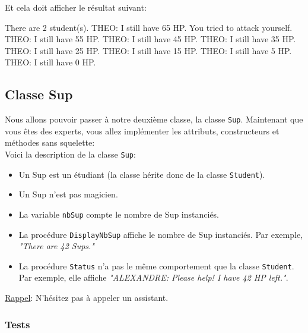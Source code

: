 \newpage
Et cela doit afficher le résultat suivant:

\begin{shell}
There are 2 student(s).
THEO: I still have 65 HP.
You tried to attack yourself.
THEO: I still have 55 HP.
THEO: I still have 45 HP.
THEO: I still have 35 HP.
THEO: I still have 25 HP.
THEO: I still have 15 HP.
THEO: I still have 5 HP.
THEO: I still have 0 HP.
\end{shell}

\subsection{Classe Sup}

Nous allons pouvoir passer à notre deuxième classe, la classe \texttt{Sup}. Maintenant que vous êtes des experts, vous allez implémenter
les attributs, constructeurs et méthodes sans squelette:\\ 

Voici la description de la classe \texttt{Sup}: 

\begin{itemize}
\item Un Sup est un étudiant (la classe hérite donc de la classe \texttt{Student}).
\item Un Sup n'est pas magicien.
\item La variable \texttt{nbSup} compte le nombre de Sup instanciés.
\item La procédure \texttt{DisplayNbSup} affiche le nombre de Sup instanciés. Par exemple, \textit{"There are 42 Sups."}
\item La procédure \texttt{Status} n'a pas le même comportement que la classe \texttt{Student}. Par exemple, elle affiche \textit{"ALEXANDRE: Please help! I have 42 HP left."}.\\
\end{itemize}

\underline{Rappel}: N'hésitez pas à appeler un assistant.

\subsubsection{Tests}

